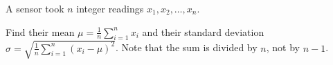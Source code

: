 A sensor took $n$ integer readings $x_1, x_2, \ldots, x_n$.

Find their mean $\mu = \frac{1}{n} \sum_{i=1}^{n} x_i$ and their standard deviation $\sigma = \sqrt{\frac{1}{n} \sum_{i=1}^{n} (x_i - \mu)^2}$. Note that the sum is divided by $n$, not by $n - 1$.
